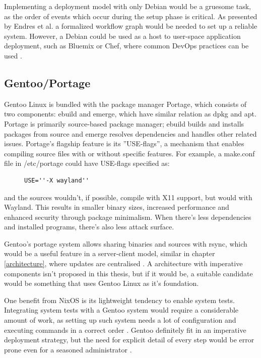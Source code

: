 Implementing a deployment model with only Debian would be a gruesome task, as the order of events which occur during the setup phase is critical. As presented by Endres et al. a formalized workflow graph would be needed to set up a reliable system. However, a Debian could be used as a host to user-space application deployment, such as Bluemix or Chef, where common DevOps practices can be used \cite{endres2017declarative}.

\subsection{Gentoo/Portage} \label{gentoo}

Gentoo Linux is bundled with the package manager Portage, which consists of two components: ebuild and emerge, which have similar relation as dpkg and apt. Portage is primarily source-based package manager; ebuild builds and installs packages from source and emerge resolves dependencies and handles other related issues. Portage's flagship feature is its ''USE-flags'', a mechanism that enables compiling source files with or without specific features. For example, a make.conf file in /etc/portage could have USE-flags specified as:
\begin{figure}[H] \label {gentoosnippet1}
\begin{lstlisting}
USE=''-X wayland''
\end{lstlisting}
\end{figure}
and the sources wouldn't, if possible, compile with X11 support, but would with Wayland. This results in smaller binary sizes, increased performance and enhanced security through package minimalism. When there's less dependencies and installed programs, there's also less attack surface. \cite{wang2017network}

Gentoo's portage system allows sharing binaries and sources with rsync, which would be a useful feature in a server-client model, similar in chapter \ref{architecture}, where updates are centralised \cite{thiruvathukal2004gentoo}. A architecture with imperative components isn't proposed in this thesis, but if it would be, a suitable candidate would be something that uses Gentoo Linux as it's foundation.

One benefit from NixOS is its lightweight tendency to enable system tests. Integrating system tests with a Gentoo system would require a considerable amount of work, as setting up such system needs a lot of configuration and executing commands in a correct order \cite{van2010automating}. Gentoo definitely fit in an imperative deployment strategy, but the need for explicit detail of every step would be error prone even for a seasoned administrator \cite{breitenbucher2017declarative}.

